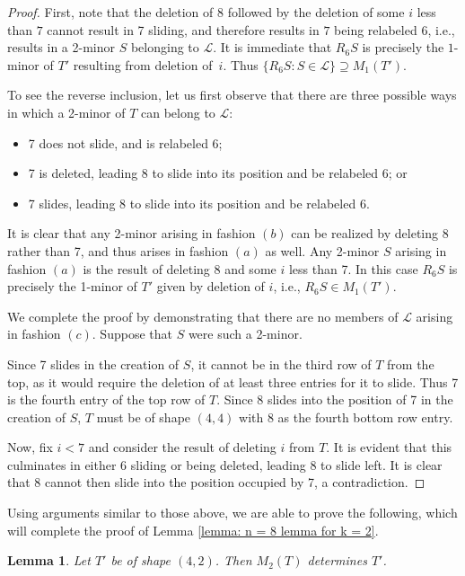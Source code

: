 \documentclass[12pt]{amsart}
\newtheorem{lemma}[theorem]{Lemma}
\theoremstyle{definition}
\theoremstyle{remark}
\numberwithin{equation}{section}
\numberwithin{figure}{section}
\begin{document}
\begin{proof}
	First, note that the deletion of 8 followed by the deletion of some $i$ less than $7$ cannot result in 7 sliding, and therefore results in $7$ being relabeled $6$, i.e., results in a 2-minor $S$ belonging to $\mathcal L$. It is immediate that $R_{6}S$ is precisely the $1$-minor of $T'$ resulting from deletion of~$i$. Thus $\{R_{6}S:S\in \mathcal L\}\supseteq M_1(T')$.
	
	To see the reverse inclusion, let us first observe that there are three possible ways in which a 2-minor of $T$ can belong to $\mathcal L$:
 \begin{itemize}
 \item[$(a)$] 7 does not slide, and is relabeled 6;
 \item[$(b)$] 7 is deleted, leading 8 to slide into its position and be relabeled 6; or
 \item[$(c)$] 7 slides, leading 8 to slide into its position and be relabeled 6.
 \end{itemize}
	
	It is clear that any 2-minor arising in fashion $(b)$ can be realized by deleting 8 rather than 7, and thus arises in fashion $(a)$ as well. Any 2-minor $S$ arising in fashion $(a)$ is the result of deleting 8 and some $i$ less than 7. In this case $R_{6}S$ is precisely the 1-minor of $T'$ given by deletion of $i$, i.e., $R_{6}S\in M_1(T')$.
	
	We complete the proof by demonstrating that there are no members of $\mathcal L$ arising in fashion $(c)$. Suppose that $S$ were such a 2-minor.
	
	Since 7 slides in the creation of $S$, it cannot be in the third row of $T$ from the top, as it would require the deletion of at least three entries for it to slide. Thus 7 is the fourth entry of the top row of $T$. Since 8 slides into the position of 7 in the creation of $S$, $T$ must be of shape $(4,4)$ with 8 as the fourth bottom row entry.
	
	Now, fix $i<7$ and consider the result of deleting $i$ from $T$. It is evident that this culminates in either 6 sliding or being deleted, leading 8 to slide left. It is clear that 8 cannot then slide into the position occupied by 7, a contradiction.	
\end{proof}

Using arguments similar to those above, we are able to prove the following, which will complete the proof of  Lemma  \ref{lemma: n = 8 lemma for k = 2}.


\begin{lemma}
	Let $T'$ be of shape $(4,2)$. Then $M_2(T)$ determines $T'$.
\end{lemma}
\end{document}
